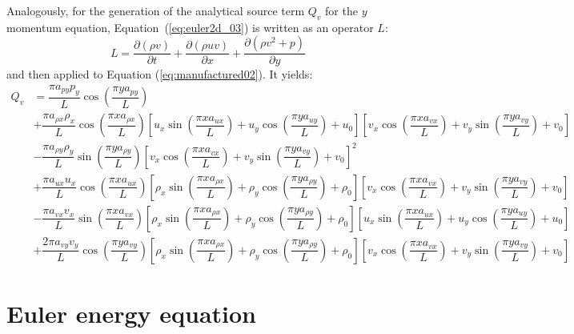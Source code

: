 \documentclass[10pt]{article}
\newcommand{\Diff}[2] {\dfrac{\partial( #1)}{\partial #2}}
\begin{document}
Analogously, for the generation of the analytical source term $Q_v$ for the $y$ momentum equation, Equation~(\ref{eq:euler2d_03}) is written as an  operator $L$:
\begin{equation}
  \label{eq:euler2d_13}
  L = \Diff{\rho v}{t}+ \Diff{\rho u v}{x} + \Diff{\rho  v^2 + p}{y}
\end{equation}
and then applied to Equation  (\ref{eq:manufactured02}). It yields:
\begin{equation}
\begin{split} 
Q_{v} &= \dfrac{\pi a_{p  y} p_{y} }{L}\cos\left(\dfrac{\pi y a_{p  y}}{L}\right)\\
&+ \dfrac{\pi a_{\rho   x} \rho _{x}}{L} \cos\left(\dfrac{\pi x a_{\rho   x}}{L}\right)\left[u_{x} \sin\left(\dfrac{\pi x a_{u  x}}{L}\right)+u_{y} \cos\left(\dfrac{\pi y a_{u  y}}{L}\right)+u_{0}\right] \left[v_{x} \cos\left(\dfrac{\pi x a_{v  x}}{L}\right)+v_{y} \sin\left(\dfrac{\pi y a_{v  y}}{L}\right)+v_{0}\right] \\
&-\dfrac{\pi a_{\rho   y} \rho _{y}}{L} \sin\left(\dfrac{\pi y a_{\rho   y}}{L}\right)\left[v_{x} \cos\left(\dfrac{\pi x a_{v  x}}{L}\right)+v_{y} \sin\left(\dfrac{\pi y a_{v  y}}{L}\right)+v_{0}\right]^2 \\
&+ \dfrac{\pi a_{u  x} u_{x} }{L}\cos\left(\dfrac{\pi x a_{u  x}}{L}\right)\left[\rho _{x} \sin\left(\dfrac{\pi x a_{\rho   x}}{L}\right)+\rho _{y} \cos\left(\dfrac{\pi y a_{\rho   y}}{L}\right)+\rho _{0}\right] \left[v_{x} \cos\left(\dfrac{\pi x a_{v  x}}{L}\right)+v_{y} \sin\left(\dfrac{\pi y a_{v  y}}{L}\right)+v_{0}\right]\\
&- \dfrac{\pi a_{v  x} v_{x} }{L}\sin\left(\dfrac{\pi x a_{v  x}}{L}\right)\left[\rho _{x} \sin\left(\dfrac{\pi x a_{\rho   x}}{L}\right)+\rho _{y} \cos\left(\dfrac{\pi y a_{\rho   y}}{L}\right)+\rho _{0}\right] \left[u_{x} \sin\left(\dfrac{\pi x a_{u  x}}{L}\right)+u_{y} \cos\left(\dfrac{\pi y a_{u  y}}{L}\right)+u_{0}\right]\\
&+ \dfrac{2 \pi a_{v  y} v_{y}}{L} \cos\left(\dfrac{\pi y a_{v  y}}{L}\right)\left[\rho _{x} \sin\left(\dfrac{\pi x a_{\rho   x}}{L}\right)+\rho _{y} \cos\left(\dfrac{\pi y a_{\rho   y}}{L}\right)+\rho _{0}\right] \left[v_{x} \cos\left(\dfrac{\pi x a_{v  x}}{L}\right)+v_{y} \sin\left(\dfrac{\pi y a_{v  y}}{L}\right)+v_{0}\right]
 \end{split}
\end{equation}



\section{Euler energy equation}
\end{document}
